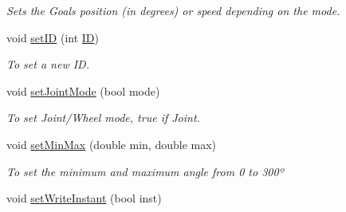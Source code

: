 \begin{DoxyCompactItemize}
\begin{DoxyCompactList}\small\item\em Sets the Goal\textquotesingle{}s position (in degrees) or speed depending on the mode. \end{DoxyCompactList}\item 
void \hyperlink{class_a_x12_ab9fe5d0e2286985977985de6d84b1103}{set\+I\+D} (int \hyperlink{class_a_x12_a08d272b502d65464202a3aa97825aec0ab2565d5698c9d943a8bcecf02b1389ad}{I\+D})
\begin{DoxyCompactList}\small\item\em To set a new I\+D. \end{DoxyCompactList}\item 
void \hyperlink{class_a_x12_ac48405a5f4aa73c1f2d56f633dfbec50}{set\+Joint\+Mode} (bool mode)
\begin{DoxyCompactList}\small\item\em To set Joint/\+Wheel mode, true if Joint. \end{DoxyCompactList}\item 
void \hyperlink{class_a_x12_a914864d133f8cbaf95594747aaff55f2}{set\+Min\+Max} (double min, double max)
\begin{DoxyCompactList}\small\item\em To set the minimum and maximum angle from 0 to 300º \end{DoxyCompactList}\item 
void \hyperlink{class_a_x12_a084bc6dcb6ad1e5eefa42bfd5de72a4d}{set\+Write\+Instant} (bool inst)
\end{DoxyCompactItemize}
